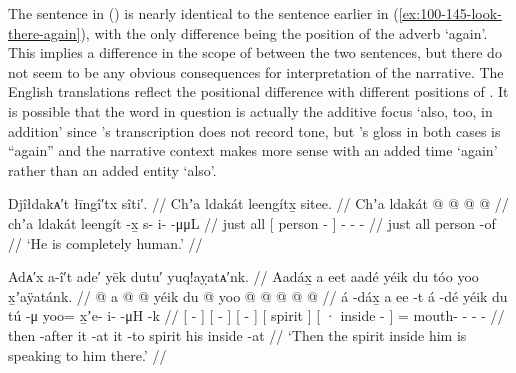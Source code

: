 The sentence in (\lastx) is nearly identical to the sentence earlier in (\ref{ex:100-145-look-there-again}), with the only difference being the position of the adverb  ‘again’.
This implies a difference in the scope of  between the two sentences, but there do not seem to be any obvious consequences for interpretation of the narrative.
The English translations reflect the positional difference with different positions of .
It is possible that the word in question is actually the additive focus  ‘also, too, in addition’ since \citeauthor{swanton:1909}’s transcription does not record tone, but \citeauthor{swanton:1909}’s gloss in both cases is “again” and the narrative context makes more sense with an added time ‘again’ rather than an added entity ‘also’.

\ex\label{ex:100-148-completely-human}%
%
\begingl
	\glpreamble	Djîłdakᴀ′t łīngî′tx sîti′. //
	\glpreamble	Chʼa ldakát leengítx̱ sitee. //
	\gla	Chʼa ldakát 
		{}  @ {} {}
		 @ {} @ {} @ {} //
	\glb 	chʼa ldakát
		{} leengít -x̱ {}
		s- i-  -μμL //
	\glc	just all
		{}[ person - {}]
		- -  - //
	\gld	just all
		{} person -of {}
		 {} {} {} //
	\glft	‘He is completely human.’
		//
\endgl
\xe

\ex\label{ex:100-149-spirit-speaking}%
%
\begingl
	\glpreamble	Adᴀ′x a-î′t ade′ yēk dutu′ yuq!aỵatᴀ′nk. //
	\glpreamble	Aadáx̱ a eet aadé yéik du tóo yoo x̱ʼaÿatánk. //
	\gla	{}  @ {} {} 
		{} a  @ {} {} 
		{}  @ {} {} 
		{} yéik {} 
		{} du  @ {} {}
		yoo @  @ {} @ {} @ {} @ {} //
	\glb	{} á -dáx̱ {} 
		{} a ee -t {} 
		{} á -dé {} 
		{} yéik {} 
		{} du tú -μ {} 
		yoo= x̱ʼe- i-  -μH -k //
	\glc	{}[  - {}]
		{}[   - {}]
		{}[  - {}]
		{}[ spirit {}]
		{}[ · inside - {}]
		= mouth- -  - - //
	\gld	{} then -after {} 
		{} it {} -at {} 
		{} it -to {} 
		{} spirit {}
		{} his inside -at {}
		  {} {} {} {} //
	\glft	‘Then the spirit inside him is speaking to him there.’
		//
\endgl
\xe

